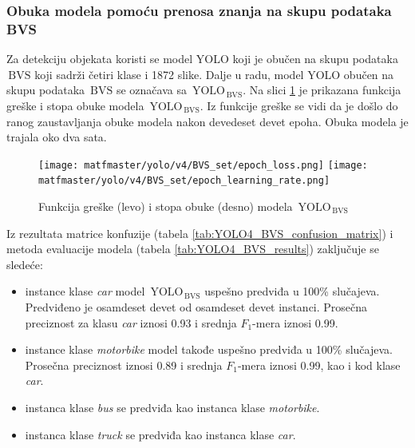 \documentclass[12pt,oneside]{memoir}
\newcommand{\yolo}{\ensuremath{\,\textrm{YOLO}}}
\newcommand{\bvs}{\ensuremath{\,\textrm{BVS}}}
\begin{document}
\subsubsection{Obuka modela pomoću prenosa znanja na skupu podataka BVS}

Za detekciju objekata koristi se model YOLO koji je obučen na skupu podataka \bvs{} koji sadrži četiri klase i 1872 slike. Dalje u radu, model YOLO obučen na skupu podataka \bvs{} se označava sa $\yolo_{\bvs}$. Na slici \ref{fig:YOLO4_BVS_loss} je prikazana funkcija greške i stopa obuke modela $\yolo_{\bvs}$. Iz funkcije greške se vidi da je došlo do ranog zaustavljanja obuke modela nakon devedeset devet epoha. Obuka modela je trajala oko dva sata.

\begin{figure}[htb]
\centering
    \texttt{[image: matfmaster/yolo/v4/BVS\_set/epoch\_loss.png]}
    \texttt{[image: matfmaster/yolo/v4/BVS\_set/epoch\_learning\_rate.png]}
\caption{Funkcija greške (levo) i stopa obuke (desno) modela $\yolo_{\bvs}$ }
\label{fig:YOLO4_BVS_loss}
\end{figure}


Iz rezultata matrice konfuzije (tabela \ref{tab:YOLO4_BVS_confusion_matrix}) i metoda evaluacije modela (tabela \ref{tab:YOLO4_BVS_results}) zaključuje se sledeće:
\begin{itemize}
    \item instance klase \textit{car} model $\yolo_{\bvs}$ uspešno predviđa u 100\% slučajeva. Predviđeno je osamdeset devet od osamdeset devet instanci. Prosečna preciznost za klasu \textit{car} iznosi 0.93 i srednja $F_1$-mera iznosi 0.99.
    \item instance klase \textit{motorbike} model takođe uspešno predviđa u 100\% slučajeva. Prosečna preciznost iznosi 0.89 i srednja $F_1$-mera iznosi 0.99, kao i kod klase \textit{car}.
    \item instanca klase \textit{bus} se predviđa kao instanca klase \textit{motorbike}.
    \item instanca klase \textit{truck} se predviđa kao instanca klase \textit{car}.
\end{itemize}
\end{document}
